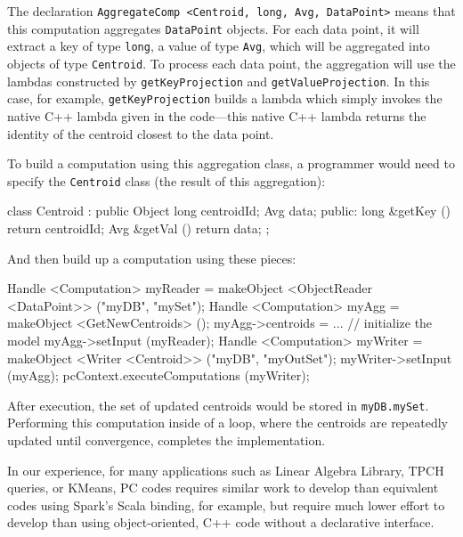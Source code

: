 \noindent 
The declaration \texttt{AggregateComp <Centroid, long, Avg, DataPoint>} means that this computation aggregates
\texttt{DataPoint} objects.  For each data point, it will extract a key of type \texttt{long}, a value of type \texttt{Avg}, which will be
aggregated into objects of type \texttt{Centroid}.  To process each data point, the aggregation will use the lambdas constructed by
\texttt{getKeyProjection} and \texttt{getValueProjection}.  
In this case, for example,
\texttt{getKeyProjection} builds a lambda which simply invokes the native C++ lambda given in the code---this
native C++ lambda returns the identity of the centroid closest to the data point.

To build a computation using this aggregation class, a programmer would need to specify the \texttt{Centroid} class (the result of this aggregation):

\begin{code}
class Centroid : public Object {
	long centroidId; 
	Avg data;
public:
	long &getKey () {return centroidId;}
	Avg &getVal () {return data;}
};
\end{code}

\noindent
And then build up a computation using these pieces:

\begin{code}
Handle <Computation> myReader = 
    makeObject <ObjectReader <DataPoint>> ("myDB", "mySet");
Handle <Computation> myAgg = makeObject <GetNewCentroids> ();
myAgg->centroids = ... // initialize the model
myAgg->setInput (myReader);
Handle <Computation> myWriter =  makeObject <Writer <Centroid>> ("myDB", "myOutSet");
    myWriter->setInput (myAgg);
pcContext.executeComputations (myWriter);
\end{code}

\noindent After execution, the set of updated centroids would be stored in \texttt{myDB.mySet}.
Performing this computation inside of a loop, where the centroids are repeatedly updated until convergence, completes the implementation.

In our experience, for many applications such as Linear Algebra
Library, TPCH queries, or KMeans, PC codes requires similar work to develop than equivalent codes using Spark's Scala binding, for
example, but require much lower effort to develop than using
object-oriented, C++ code without a declarative interface.

